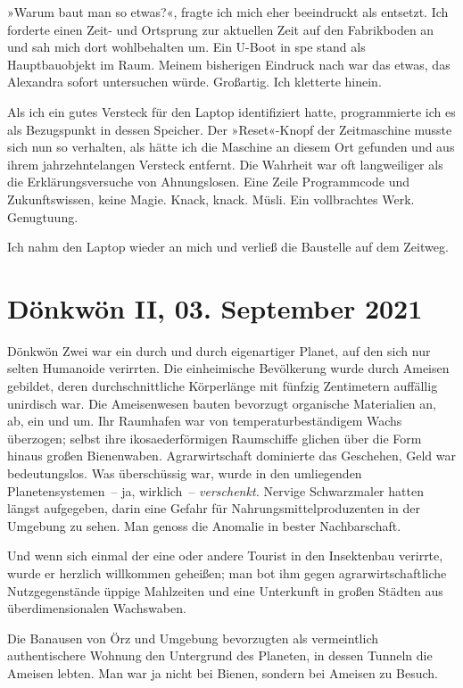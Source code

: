»Warum baut man so etwas?«, fragte ich mich eher beeindruckt als entsetzt. Ich forderte einen Zeit- und Ortsprung zur aktuellen Zeit auf den Fabrikboden an und sah mich dort wohlbehalten um. Ein U-Boot in spe stand als Hauptbauobjekt im Raum. Meinem bisherigen Eindruck nach war das etwas, das Alexandra sofort untersuchen würde. Großartig. Ich kletterte hinein.

Als ich ein gutes Versteck für den Laptop identifiziert hatte, programmierte ich es als Bezugspunkt in dessen Speicher. Der »Reset«-Knopf der Zeitmaschine musste sich nun so verhalten, als hätte ich die Maschine an diesem Ort gefunden und aus ihrem jahrzehntelangen Versteck entfernt. Die Wahrheit war oft langweiliger als die Erklärungsversuche von Ahnungslosen. Eine Zeile Programmcode und Zukunftswissen, keine Magie. Knack, knack. Müsli. Ein vollbrachtes Werk. Genugtuung.

Ich nahm den Laptop wieder an mich und verließ die Baustelle auf dem Zeitweg.


\chapter{Dönkwön II, 03. September 2021}

Dönkwön Zwei war ein durch und durch eigenartiger Planet, auf den sich nur selten Humanoide verirrten. Die einheimische Bevölkerung wurde durch Ameisen gebildet, deren durchschnittliche Körperlänge mit fünfzig Zentimetern auffällig unirdisch war. Die Ameisenwesen bauten bevorzugt organische Materialien an, ab, ein und um. Ihr Raumhafen war von temperaturbeständigem Wachs überzogen; selbst ihre ikosaederförmigen Raumschiffe glichen über die Form hinaus großen Bienenwaben. Agrarwirtschaft dominierte das Geschehen, Geld war bedeutungslos. Was überschüssig war, wurde in den umliegenden Planetensystemen~– ja, wirklich~– \emph{verschenkt.} Nervige Schwarzmaler hatten längst aufgegeben, darin eine Gefahr für Nahrungsmittelproduzenten in der Umgebung zu sehen. Man genoss die Anomalie in bester Nachbarschaft.

Und wenn sich einmal der eine oder andere Tourist in den Insektenbau verirrte, wurde er herzlich willkommen geheißen; man bot ihm gegen agrarwirtschaftliche Nutzgegenstände üppige Mahlzeiten und eine Unterkunft in großen Städten aus überdimensionalen Wachswaben.

Die Banausen von Örz und Umgebung bevorzugten als vermeintlich authentischere Wohnung den Untergrund des Planeten, in dessen Tunneln die Ameisen lebten. Man war ja nicht bei Bienen, sondern bei Ameisen zu Besuch.

